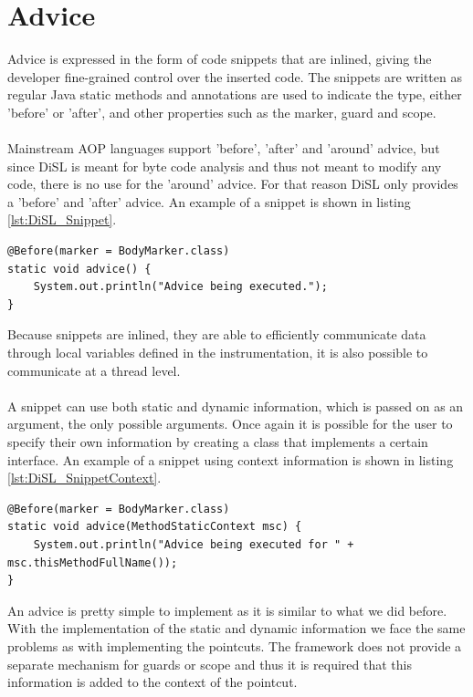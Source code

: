 \documentclass[a4paper]{report}
\begin{document}
\section{Advice}
Advice is expressed in the form of code snippets that are inlined, giving the developer fine-grained control over the inserted code. The snippets are written as regular Java static methods and annotations are used to indicate the type, either 'before' or 'after', and other properties such as the marker, guard and scope.\\
\\
Mainstream AOP languages support 'before', 'after' and 'around' advice, but since DiSL is meant for byte code analysis and thus not meant to modify any code, there is no use for the 'around' advice. For that reason DiSL only provides a 'before' and 'after' advice. An example of a snippet is shown in listing \ref{lst:DiSL_Snippet}.\\
\begin{lstlisting}[caption=Example of a snippet.,label=lst:DiSL_Snippet]
@Before(marker = BodyMarker.class)
static void advice() {
	System.out.println("Advice being executed.");
}
\end{lstlisting}
Because snippets are inlined, they are able to efficiently communicate data through local variables defined in the instrumentation, it is also possible to communicate at a thread level.\\
\\
A snippet can use both static and dynamic information, which is passed on as an argument, the only possible arguments. Once again it is possible for the user to specify their own information by creating a class that implements a certain interface. An example of a snippet using context information is shown in listing \ref{lst:DiSL_SnippetContext}.
\begin{lstlisting}[caption=Example of a snippet using context information.,label=lst:DiSL_SnippetContext]
@Before(marker = BodyMarker.class)
static void advice(MethodStaticContext msc) {
	System.out.println("Advice being executed for " + msc.thisMethodFullName());
}
\end{lstlisting}
An advice is pretty simple to implement as it is similar to what we did before. With the implementation of the static and dynamic information we face the same problems as with implementing the pointcuts. The framework does not provide a separate mechanism for guards or scope and thus it is required that this information is added to the context of the pointcut.
\end{document}
